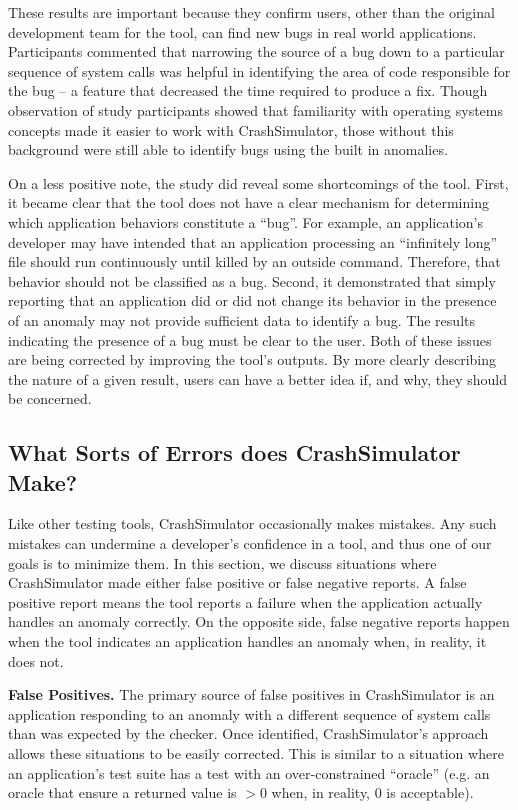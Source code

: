 These results are important
because they confirm
users, other than the original development team for the tool,
can find new bugs in real world applications.
Participants commented that narrowing the source of a bug
down to a particular sequence of system calls
was helpful in identifying the area of
code responsible for the bug -- a feature
that decreased the time required to produce a fix.
Though observation of study participants
showed that familiarity with operating systems concepts
made it easier to work with CrashSimulator,
those without this background were still able to identify bugs using the
built in anomalies.

On a less positive note,
the study did reveal
some shortcomings
of the tool.
First,
it became clear that the tool
does not have a clear mechanism
for determining
which application behaviors constitute a ``bug''.
For example, an application's developer
may have intended that an application processing an ``infinitely long'' file should run continuously
until killed by an outside command.
Therefore, that behavior should not be classified as a bug.
Second,
it demonstrated that
simply reporting that an application did or did not change its behavior
in the presence of an anomaly may not provide sufficient data to identify a bug. The results indicating the presence of a bug must be clear to the user.
Both of these issues are being corrected
by improving the tool's outputs.
By more clearly describing
the nature of a given result,
users can have a better idea
if,
and why,
they should be concerned.


\subsection{What Sorts of Errors does CrashSimulator Make?}
\label{sec-sorts-errors}

Like other testing tools, CrashSimulator occasionally makes mistakes.
Any such mistakes can
undermine a developer's confidence in a tool, and thus one of our goals is
to minimize them.   In this section, we discuss
situations where CrashSimulator made either false positive or false
negative reports.  A false positive report means the tool reports
a failure when the application actually handles an anomaly correctly.
On the opposite side, false negative reports happen when the tool indicates an application handles
an anomaly when, in reality, it does not.

\textbf{False Positives.}
The primary source of false positives in CrashSimulator is an application
responding to an anomaly with a different sequence of system calls
than was expected by the checker.
Once identified, CrashSimulator's approach allows these
situations to be easily corrected.
This is similar to a situation
where an application's test suite
has a test with an over-constrained ``oracle''
(e.g. an oracle that ensure a returned value is $>0$ when, in reality,
$0$ is acceptable).

